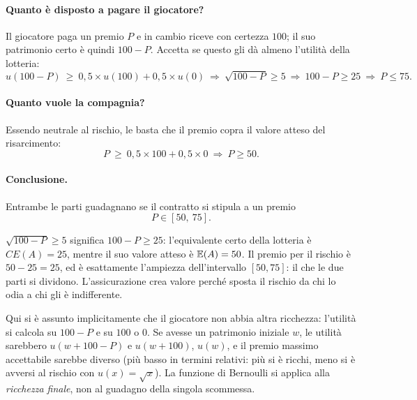\paragraph{Quanto è disposto a pagare il giocatore?}
Il giocatore paga un premio $P$ e in cambio riceve con certezza $100$; il suo patrimonio
certo è quindi $100 - P$. Accetta se questo gli dà almeno l'utilità della lotteria:
\[
  u(100 - P) \ \geq\ 0{,}5 \times u(100) + 0{,}5 \times u(0)
  \ \Longrightarrow\ \sqrt{100 - P} \geq 5
  \ \Longrightarrow\ 100 - P \geq 25
  \ \Longrightarrow\ P \leq 75 .
\]

\paragraph{Quanto vuole la compagnia?}
Essendo neutrale al rischio, le basta che il premio copra il valore atteso del risarcimento:
\[
  P \ \geq\ 0{,}5 \times 100 + 0{,}5 \times 0 \ \Longrightarrow\ P \geq 50 .
\]

\paragraph{Conclusione.} Entrambe le parti guadagnano se il contratto si stipula a un
premio
\[
  P \in [50,\ 75].
\]

\begin{osservazione}
$\sqrt{100-P} \ge 5$ significa $100 - P \ge 25$: l'equivalente certo della lotteria è
$CE(A) = 25$, mentre il suo valore atteso è $\mathbb{E}(A) = 50$. Il premio per il rischio è
$50 - 25 = 25$, ed è esattamente l'ampiezza dell'intervallo $[50,75]$: il
 che le due parti si dividono. L'assicurazione crea valore perché sposta il
rischio da chi lo odia a chi gli è indifferente.
\end{osservazione}

\begin{attenzione}
Qui si è assunto implicitamente che il giocatore non abbia altra ricchezza: l'utilità si
calcola su $100 - P$ e su $100$ o $0$. Se avesse un patrimonio iniziale $w$, le utilità
sarebbero $u(w + 100 - P)$ e $u(w+100)$, $u(w)$, e il premio massimo accettabile sarebbe
diverso (più basso in termini relativi: più si è ricchi, meno si è avversi al rischio
con $u(x) = \sqrt{x}$). La funzione di Bernoulli si applica alla \emph{ricchezza
finale}, non al guadagno della singola scommessa.
\end{attenzione}

